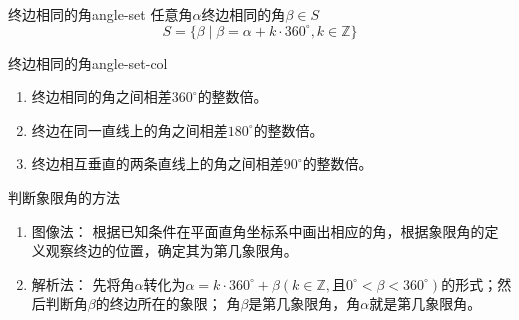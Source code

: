 \begin{definition}{终边相同的角}{angle-set}
任意角$\alpha$终边相同的角$\beta \in S$
\begin{equation}
S = \{\beta \mid \beta = \alpha + k \cdot 360^{\circ}, k \in \mathbb{Z} \}
\end{equation}
\end{definition}

\begin{corollary}{终边相同的角}{angle-set-col}
\begin{enumerate}
\item 终边相同的角之间相差$360^{\circ}$的整数倍。
\item 终边在同一直线上的角之间相差$180^{\circ}$的整数倍。
\item 终边相互垂直的两条直线上的角之间相差$90^{\circ}$的整数倍。
\end{enumerate}
\end{corollary}

\begin{note}{判断象限角的方法}
\begin{enumerate}
\item 图像法： 根据已知条件在平面直角坐标系中画出相应的角，根据象限角的定义观察终边的位置，确定其为第几象限角。
\item 解析法： 先将角$\alpha$转化为$\alpha = k \cdot 360^{\circ} + \beta \left(k \in \mathbb{Z}, \mbox{且} 0^{\circ} < \beta < 360^{\circ} \right)$的形式；然后判断角$\beta$的终边所在的象限； 角$\beta$是第几象限角，角$\alpha$就是第几象限角。
\end{enumerate}
\end{note}

